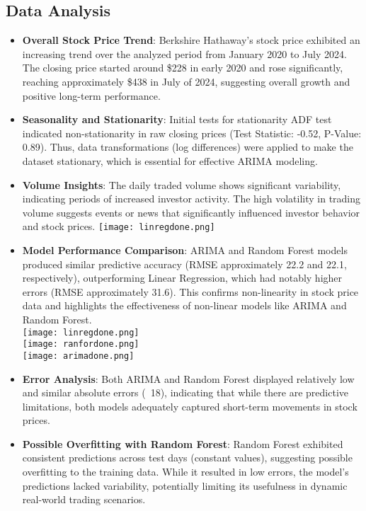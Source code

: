 \documentclass[conference]{IEEEtran}
\begin{document}
\subsection{Data Analysis}\label{AA}
\begin{itemize}
    \item \textbf{Overall Stock Price Trend}: Berkshire Hathaway's stock price exhibited an increasing trend over the analyzed period from January 2020 to July 2024. The closing price started around \$228 in early 2020 and rose significantly, reaching approximately \$438 in July of 2024, suggesting overall growth and positive long-term performance.
    \item \textbf{Seasonality and Stationarity}: Initial tests for stationarity ADF test indicated non-stationarity in raw closing prices (Test Statistic: -0.52, P-Value: 0.89). Thus, data transformations (log differences) were applied to make the dataset stationary, which is essential for effective ARIMA modeling.
    \item \textbf{Volume Insights}: The daily traded volume shows significant variability, indicating periods of increased investor activity. The high volatility in trading volume suggests events or news that significantly influenced investor behavior and stock prices.
     \texttt{[image: linregdone.png]} %
    \item \textbf{Model Performance Comparison}: ARIMA and Random Forest models produced similar predictive accuracy (RMSE approximately 22.2 and 22.1, respectively), outperforming Linear Regression, which had notably higher errors (RMSE approximately 31.6). This confirms non-linearity in stock price data and highlights the effectiveness of non-linear models like ARIMA and Random Forest.
    \\
     \texttt{[image: linregdone.png]} %
     \\
      \texttt{[image: ranfordone.png]} %
    \\
       \texttt{[image: arimadone.png]} %
    \item \textbf{Error Analysis}: Both ARIMA and Random Forest displayed relatively low and similar absolute errors (~18), indicating that while there are predictive limitations, both models adequately captured short-term movements in stock prices.
    \item \textbf{Possible Overfitting with Random Forest}: Random Forest exhibited consistent predictions across test days (constant values), suggesting possible overfitting to the training data. While it resulted in low errors, the model’s predictions lacked variability, potentially limiting its usefulness in dynamic real-world trading scenarios.
\end{itemize}
\end{document}
